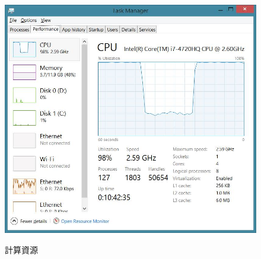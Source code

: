 \documentclass[12pt]{article}
\begin{document}
\begin{CJK}{UTF8}{bsmi}
\begin{figure}
  \caption{計算資源}
  \centering
  \includegraphics[width=.6\textwidth]{cpu}
  \label{cpu}
\end{figure}



\end{CJK}
\end{document}
